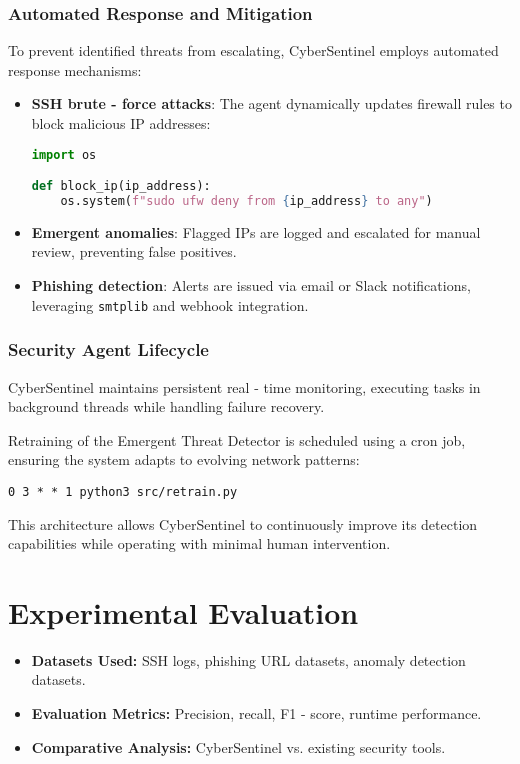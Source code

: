 \documentclass{article}
\begin{document}
\subsubsection{Automated Response and Mitigation}
To prevent identified threats from escalating, CyberSentinel employs automated response mechanisms:
\begin{itemize}
    \item \textbf{SSH brute - force attacks}: The agent dynamically updates firewall rules to block malicious IP addresses:
\begin{lstlisting}[language=Python, breaklines=true, frame=single, backgroundcolor=\color{gray!10}]
import os

def block_ip(ip_address):
    os.system(f"sudo ufw deny from {ip_address} to any")
\end{lstlisting}

    \item \textbf{Emergent anomalies}: Flagged IPs are logged and escalated for manual review, preventing false positives.
    \item \textbf{Phishing detection}: Alerts are issued via email or Slack notifications, leveraging \texttt{smtplib} and webhook integration.
\end{itemize}

\subsubsection{Security Agent Lifecycle}
CyberSentinel maintains persistent real - time monitoring, executing tasks in background threads while handling failure recovery. 

Retraining of the Emergent Threat Detector is scheduled using a cron job, ensuring the system adapts to evolving network patterns:
\begin{verbatim}
0 3 * * 1 python3 src/retrain.py
\end{verbatim}
This architecture allows CyberSentinel to continuously improve its detection capabilities while operating with minimal human intervention.

\section{Experimental Evaluation}
\begin{itemize}
    \item \textbf{Datasets Used:} SSH logs, phishing URL datasets, anomaly detection datasets.
    \item \textbf{Evaluation Metrics:} Precision, recall, F1 - score, runtime performance.
    \item \textbf{Comparative Analysis:} CyberSentinel vs. existing security tools.
\end{itemize}
\end{document}
